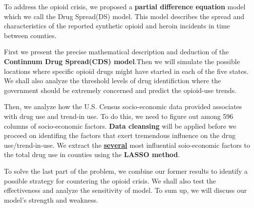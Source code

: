 To address the opioid crisis, we proposed a \textbf{partial difference equation} model which we call the Drug Spread(DS) model. This model describes the spread and characteristics of the reported synthetic opioid and heroin incidents in time between counties.

First we present the precise mathematical description and deduction of the \textbf{Continnum Drug Spread(CDS) model}.Then we will simulate the possible locations where specific opioid drugs might have started in each of the five states. We shall also analyze the threshold levels of drug identifiction where the government should be extremely concerned and predict the opioid-use trends.

Then, we analyze how the U.S. Census socio-economic data provided associates with drug use and trend-in use. To do this, we need to figure out among 596 columns of socio-economic factors. \textbf{Data cleansing} will be applied before we proceed on identifing the factors that exert tremendous influence on the drug use/trend-in-use. We extract the  \textbf{\underline{several}} most influential soio-economic factors to the total drug use in counties using the \textbf{LASSO method}. 

To solve the last part of the problem, we combine our former results to identify a possible strategy for countering the opioid crisis. We shall also test the effectiveness and analyze the sensitivity of model. To sum up, we will discuss our model's strength and weakness.





